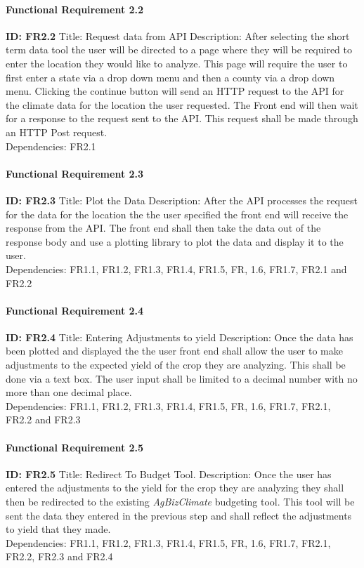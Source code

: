 \documentclass[onecolumn, draftclsnofoot,10pt, compsoc]{article}
\begin{document}
				\paragraph{Functional Requirement 2.2}
					\textbf{ID: FR2.2}\hfill \break
					Title: Request data from API\hfill \break
					Description: After selecting the short term data tool the user will be directed to a page where they will be required to enter the location they would like to analyze. This page will require the user to first enter a state via a drop down menu and then a county via a drop down menu. Clicking the continue button will send an HTTP request to the API for the climate data for the location the user requested. The Front end will then wait for a response to the request sent to the API. This request shall be made through an HTTP Post request.\\
					Dependencies: FR2.1\hfill \break

				\paragraph{Functional Requirement 2.3}
					\textbf{ID: FR2.3}\hfill \break
					Title: Plot the Data\hfill \break
					Description: After the API processes the request for the data for the location the the user specified the front end will receive the response from the API. The front end shall then take the data out of the response body and use a plotting library to plot the data and display it to the user.\\
					Dependencies: FR1.1, FR1.2, FR1.3, FR1.4, FR1.5, FR, 1.6, FR1.7, FR2.1 and FR2.2\hfill \break

				\paragraph{Functional Requirement 2.4}
					\textbf{ID: FR2.4}\hfill \break
					Title: Entering Adjustments to yield\hfill \break
					Description: Once the data has been plotted and displayed the the user front end shall allow the user to make adjustments to the expected yield of the crop they are analyzing. This shall be done via a text box. The user input shall be limited to a decimal number with no more than one decimal place.\\
					Dependencies: FR1.1, FR1.2, FR1.3, FR1.4, FR1.5, FR, 1.6, FR1.7, FR2.1, FR2.2 and FR2.3\hfill \break

				\paragraph{Functional Requirement 2.5}
					\textbf{ID: FR2.5}\hfill \break
					Title: Redirect To Budget Tool.\hfill \break
					Description: Once the user has entered the adjustments to the yield for the crop they are analyzing they shall then be redirected to the existing \textit{AgBizClimate} budgeting tool. This tool will be sent the data they entered in the previous step and shall reflect the adjustments to yield that they made.\\
					Dependencies: FR1.1, FR1.2, FR1.3, FR1.4, FR1.5, FR, 1.6, FR1.7, FR2.1, FR2.2, FR2.3 and FR2.4\hfill \break
\end{document}
